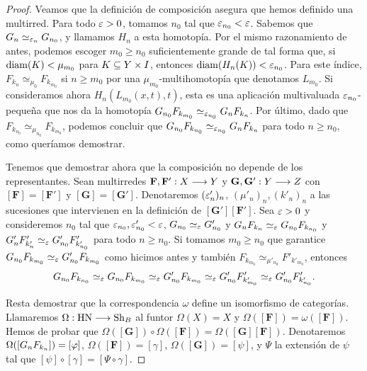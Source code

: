 \begin{proof}
  Veamos que la definición de composición asegura que hemos definido una multirred. Para todo $ \varepsilon>0  $, tomamos $ n_0 $ tal que $ \varepsilon_{n_0}<\varepsilon $. Sabemos que $ G_n\simeq_{\varepsilon_n}G_{n_0} $, y llamamos $ H_{n} $ a esta homotopía. Por el mismo razonamiento de antes, podemos escoger $ m_0\geq n_0  $ suficientemente grande de tal forma que, si $ \operatorname{diam}(K)<\mu_{m_0}  $ para $ K\subseteq Y\times I  $, entonces $ \operatorname{diam}(H_n(K))<\varepsilon_{n_0} $. Para este índice, $ F_{k_{n}}\simeq_{\mu_0} F_{k_{m_0}} $ si $ n\geq m_0 $ por una $ \mu_{m_0} $-multihomotopía que denotamos $ L_{m_0} $. Si consideramos ahora $ H_{n}(L_{m_0}(x,t),t) $, esta es una aplicación multivaluada $ \varepsilon_{n_0} $-peque\~na que nos da la homotopía $G_{n_0}F_{k_{m_0}}\simeq_{\varepsilon_{n_0}}G_nF_{k_n} $. Por último, dado que $ F_{k_{n_0}}\simeq_{\mu_{n_0}} F_{k_{m_0}} $, podemos concluir que $ G_{n_0}F_{k_{n_0}}\simeq _{\varepsilon_{n_0}} G_nF_{k_n} $ para todo $ n\geq n_0  $, como queríamos demostrar.

  Tenemos que demostrar ahora que la composición no depende de los representantes. Sean multirredes $ \mathbf{F},\mathbf{F'}:X\longrightarrow Y  $ y $ \mathbf{G},\mathbf{G'}:Y\longrightarrow Z $ con $ [\mathbf{F}] = [\mathbf{F'}] $ y $ [\mathbf{G}] = [\mathbf{G'}] $. Denotaremos $ (\varepsilon'_n)_n  $, $ (\mu'_n)_n ,(k'_n)_n  $ a las sucesiones que intervienen en la definición de $ [\mathbf{G'}][\mathbf{F' }] $. Sea $ \varepsilon>0 $ y consideremos $ n_0 $ tal que $ \varepsilon_{n_0},\varepsilon'_{n_0}<\varepsilon  $, $ G_{n_0} \simeq_{\varepsilon}G'_{n_0} $ y $ G_nF_{k_n}\simeq_\varepsilon G_{n_0}F_{k_{n_0}} $ y $ G'_nF'_{k'_n}\simeq_\varepsilon G'_{n_0}F'_{k'_{n_0}}  $ para todo $ n\geq n_0 $. Si tomamos $ m_0 \geq n_0 $ que garantice $ G_{n_0}F_{k_{m_0}}\simeq_\varepsilon G'_{n_0}F_{k_{m_0}} $ como hicimos antes y también $ F_{k_{m_0}}\simeq_{\mu'_{n_0}} F'_{k'_{m_0}} $, entonces 
  \begin{gather*}
    G_{n_0}F_{k_{n_0}} \simeq_\varepsilon G_{n_0}F_{k_{m_0}}\simeq_\varepsilon G'_{n_0}F_{k_{m_0}} \simeq_\varepsilon  G'_{n_0}F'_{k'_{m_0}} \simeq_\varepsilon G'_{n_0}F'_{k'_{n_0}}.
  \end{gather*}

  Resta demostrar que la correspondencia $ \omega $ define un isomorfismo de categorías. Llamaremos $ \Omega :\text{HN}\longrightarrow \operatorname{Sh}_B $ al funtor $ \Omega(X) = X  $ y $ \Omega ([\mathbf{F}]) = \omega([\mathbf{F}]) $. Hemos de probar que $ \Omega([\mathbf{G}])\circ \Omega([\mathbf{F}]) = \Omega ([\mathbf{G}][\mathbf{F}]) $. Denotaremos $\Omega ([G_nF_{k_n}]) = [\varphi] $, $ \Omega([\mathbf{F}]) = [\gamma  ] $, $ \Omega([\mathbf{G}]) = [\psi] $, y $ \Psi $ la extensión de $ \psi  $ tal que $ [\psi]\circ[\gamma] = [\Psi \circ \gamma ] $.
  

\end{proof}

